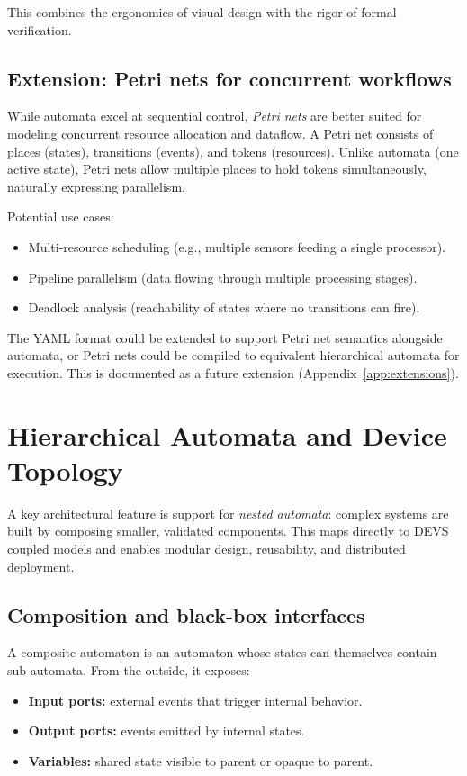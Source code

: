 This combines the ergonomics of visual design with the rigor of formal verification.

\subsection{Extension: Petri nets for concurrent workflows}

While automata excel at sequential control, \emph{Petri nets} are better suited for modeling concurrent resource allocation and dataflow.
A Petri net consists of places (states), transitions (events), and tokens (resources).
Unlike automata (one active state), Petri nets allow multiple places to hold tokens simultaneously, naturally expressing parallelism.

Potential use cases:
\begin{itemize}
  \item Multi-resource scheduling (e.g., multiple sensors feeding a single processor).
  \item Pipeline parallelism (data flowing through multiple processing stages).
  \item Deadlock analysis (reachability of states where no transitions can fire).
\end{itemize}

The YAML format could be extended to support Petri net semantics alongside automata, or Petri nets could be compiled to equivalent hierarchical automata for execution.
This is documented as a future extension (Appendix~\ref{app:extensions}).

\section{Hierarchical Automata and Device Topology}

A key architectural feature is support for \emph{nested automata}: complex systems are built by composing smaller, validated components.
This maps directly to DEVS coupled models and enables modular design, reusability, and distributed deployment.

\subsection{Composition and black-box interfaces}

A composite automaton is an automaton whose states can themselves contain sub-automata.
From the outside, it exposes:
\begin{itemize}
  \item \textbf{Input ports:} external events that trigger internal behavior.
  \item \textbf{Output ports:} events emitted by internal states.
  \item \textbf{Variables:} shared state visible to parent or opaque to parent.
\end{itemize}

